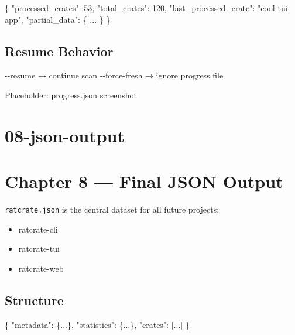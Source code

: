 \documentclass[
  letterpaper,
  DIV=11,
  numbers=noendperiod]{scrreprt}
\newenvironment{Shaded}{\begin{snugshade}}{\end{snugshade}}
\newcommand{\DataTypeTok}[1]{\textcolor[rgb]{0.68,0.00,0.00}{#1}}
\newcommand{\DecValTok}[1]{\textcolor[rgb]{0.68,0.00,0.00}{#1}}
\newcommand{\ErrorTok}[1]{\textcolor[rgb]{0.68,0.00,0.00}{#1}}
\newcommand{\FunctionTok}[1]{\textcolor[rgb]{0.28,0.35,0.67}{#1}}
\newcommand{\NormalTok}[1]{\textcolor[rgb]{0.00,0.23,0.31}{#1}}
\newcommand{\OtherTok}[1]{\textcolor[rgb]{0.00,0.23,0.31}{#1}}
\newcommand{\StringTok}[1]{\textcolor[rgb]{0.13,0.47,0.30}{#1}}
\providecommand{\tightlist}{%
  \setlength{\itemsep}{0pt}\setlength{\parskip}{0pt}}
\begin{document}
\begin{Shaded}
\begin{Highlighting}[]
\FunctionTok{\{}
  \DataTypeTok{"processed\_crates"}\FunctionTok{:} \DecValTok{53}\FunctionTok{,}
  \DataTypeTok{"total\_crates"}\FunctionTok{:} \DecValTok{120}\FunctionTok{,}
  \DataTypeTok{"last\_processed\_crate"}\FunctionTok{:} \StringTok{"cool{-}tui{-}app"}\FunctionTok{,}
  \DataTypeTok{"partial\_data"}\FunctionTok{:} \FunctionTok{\{} \ErrorTok{...} \FunctionTok{\}}
\FunctionTok{\}}
\end{Highlighting}
\end{Shaded}

\section{Resume Behavior}\label{resume-behavior}

\begin{Shaded}
\begin{Highlighting}[]
\NormalTok{{-}{-}resume → continue scan  }
\NormalTok{{-}{-}force{-}fresh → ignore progress file}
\end{Highlighting}
\end{Shaded}

Placeholder: progress.json screenshot

\chapter{08-json-output}\label{json-output}

\chapter{Chapter 8 --- Final JSON
Output}\label{chapter-8-final-json-output}

\texttt{ratcrate.json} is the central dataset for all future projects:

\begin{itemize}
\tightlist
\item
  ratcrate-cli
\item
  ratcrate-tui
\item
  ratcrate-web
\end{itemize}

\section{Structure}\label{structure}

\begin{Shaded}
\begin{Highlighting}[]
\FunctionTok{\{}
  \DataTypeTok{"metadata"}\FunctionTok{:} \FunctionTok{\{}\ErrorTok{...}\FunctionTok{\},}
  \DataTypeTok{"statistics"}\FunctionTok{:} \FunctionTok{\{}\ErrorTok{...}\FunctionTok{\},}
  \DataTypeTok{"crates"}\FunctionTok{:} \OtherTok{[}\ErrorTok{...}\OtherTok{]}
\FunctionTok{\}}
\end{Highlighting}
\end{Shaded}
\end{document}
